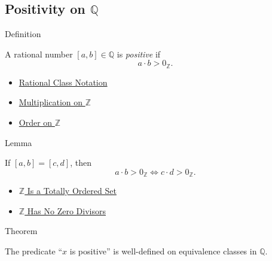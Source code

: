 \subsection*{\texorpdfstring{Positivity on $\mathbb{Q}$}{Positivity on Q}}

\begin{definitionbox}{Definition}
\begin{definition}
\label{def:positive-rational}
A rational number $[a,b]\in\mathbb{Q}$ is \emph{positive} if
\[
a\cdot b>0_{\mathbb{Z}}.
\]
\end{definition}
\end{definitionbox}

\begin{dependencies}
\begin{itemize}
  \item \hyperref[def:rational-class-notation]{Rational Class Notation}
  \item \hyperref[def:multiplication-on-z-classes]{Multiplication on $\mathbb{Z}$}
  \item \hyperref[def:order-on-z]{Order on $\mathbb{Z}$}
\end{itemize}
\end{dependencies}

\begin{lemmabox}{Lemma}
\begin{lemma}
\label{lem:positivity-respects-equivalence-q}
If $[a,b]=[c,d]$, then
\[
a\cdot b>0_{\mathbb{Z}}
\Longleftrightarrow
c\cdot d>0_{\mathbb{Z}}.
\]
\end{lemma}
\end{lemmabox}

\begin{dependencies}
\begin{itemize}
  \item \hyperref[thm:z-totally-ordered-set]{$\mathbb{Z}$ Is a Totally Ordered Set}
  \item \hyperref[thm:z-has-no-zero-divisors]{$\mathbb{Z}$ Has No Zero Divisors}
\end{itemize}
\end{dependencies}

\begin{theorembox}{Theorem}
\begin{theorem}
\label{thm:positivity-on-q-well-defined}
The predicate ``$x$ is positive'' is well-defined on equivalence classes in
$\mathbb{Q}$.
\end{theorem}
\end{theorembox}

